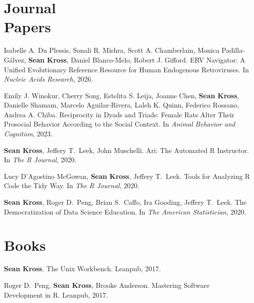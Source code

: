 
\section{Journal \\ Papers}

\begin{bibenum}

\item[J.5] Isabelle A. Du Plessis, Sonali R. Mishra, Scott A. Chamberlain, Monica Padilla-Gálvez, \textbf{Sean Kross}, Daniel Blanco-Melo, 
Robert J. Gifford.
ERV Navigator: A Unified Evolutionary Reference Resource for Human Endogenous Retroviruses.
In \emph{Nucleic Acids Research}, 2026.

\item[J.4] Emily J. Winokur, Cherry Song, Estelita S. Leija, Joanne Chen, 
\textbf{Sean Kross}, Danielle Shamam, Marcelo Aguilar-Rivera, Laleh K. Quinn, 
Federico Rossano, Andrea A. Chiba.
Reciprocity in Dyads and Triads: Female Rats Alter Their Prosocial Behavior 
According to the Social Context.
In \emph{Animal Behavior and Cognition}, 2023.

\item[J.3] \textbf{Sean Kross}, Jeffery T.\ Leek, John Muschelli.
Ari: The Automated R Instructor. 
In \emph{The R Journal}, 2020.

\item[J.2] Lucy D'Agostino McGowan, \textbf{Sean Kross}, Jeffery T.\ Leek.
Tools for Analyzing R Code the Tidy Way. 
In \emph{The R Journal}, 2020.

\item[J.1] \textbf{Sean Kross}, Roger D.\ Peng, Brian S.\ Caffo, Ira Gooding,
Jeffery T.\ Leek. The Democratization of Data Science Education. 
In \emph{The American Statistician}, 2020.

\end{bibenum}

\vspace{0.1in}

\section{Books}

\begin{bibenum}

\item[B.2] \textbf{Sean Kross}. The Unix Workbench. Leanpub, 2017.

\item[B.1] Roger D.\ Peng, \textbf{Sean Kross}, Brooke Anderson. Mastering 
Software Development in R. Leanpub, 2017.

\end{bibenum}

